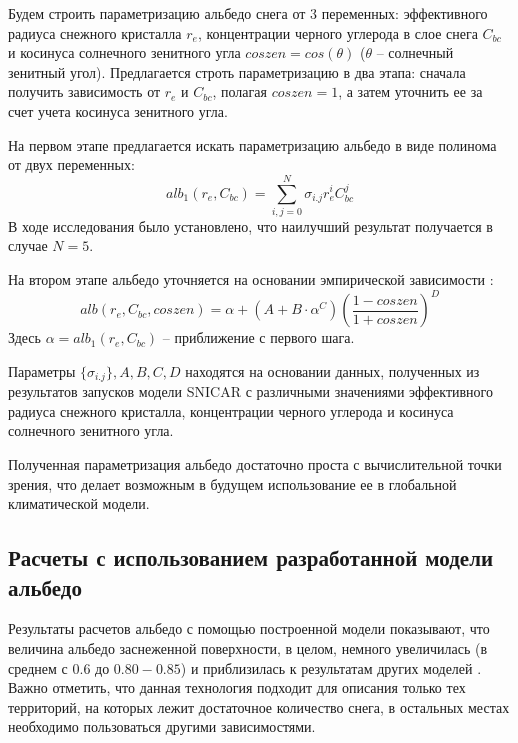 \documentclass[a4paper, fontsize=14pt]{scrartcl}
\begin{document}
Будем строить параметризацию альбедо снега от 3 переменных: эффективного радиуса снежного кристалла $r_e$, концентрации черного углерода в слое снега $C_{bc}$ и косинуса солнечного зенитного угла $coszen = cos(\theta)$ ($\theta$ -- солнечный зенитный угол). Предлагается строть параметризацию в два этапа: сначала получить зависимость от $r_e$ и $C_{bc}$, полагая $coszen = 1$, а затем уточнить ее за счет учета косинуса зенитного угла.

На первом этапе предлагается искать параметризацию альбедо в виде полинома от двух переменных:
\begin{equation}
    alb_1(r_e, C_{bc}) = \sum_{i,j = 0}^N \sigma_{i.j} r_e^i C_{bc}^j   \label{sys}  
\end{equation}
В ходе исследования \cite{mipt2020} было установлено, что наилучший результат получается в случае $N = 5$.

На втором этапе альбедо уточняется на основании эмпирической зависимости \cite{Saito2019}:
\begin{equation}
    alb(r_e, C_{bc}, coszen) = \alpha + (A + B \cdot \alpha^C) \left( \dfrac{1 - coszen}{1 + coszen} \right)^D     \label{sys}  
\end{equation}
Здесь $\alpha = alb_1(r_e, C_{bc})$ -- приближение с первого шага.

Параметры $\{ \sigma_{i.j} \}, A, B, C, D$ находятся на основании данных, полученных из результатов запусков модели SNICAR с различными значениями эффективного радиуса снежного кристалла, концентрации черного углерода и косинуса солнечного зенитного угла.

Полученная параметризация альбедо достаточно проста с вычислительной точки зрения, что делает возможным в будущем использование ее в глобальной климатической модели.

\subsection{Расчеты с использованием разработанной модели альбедо}

Результаты расчетов альбедо с помощью построенной модели показывают, что величина альбедо заснеженной поверхности, в целом, немного увеличилась (в среднем с $0.6$ до $0.80-0.85$) и приблизилась к результатам других моделей \cite{Flanner2007, Gueymard2019}. Важно отметить, что данная технология подходит для описания только тех территорий, на которых лежит достаточное количество снега, в остальных местах необходимо пользоваться другими зависимостями.
\end{document}
